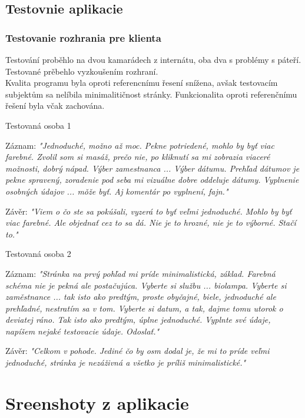 \newpage

\subsection{Testovnie aplikacie} \label{client_testing}

\subsubsection{Testovanie rozhrania pre klienta}
Testování proběhlo na dvou kamarádech z internátu, oba dva s problémy s páteří. \\
Testované prěbehlo vyzkoušením rozhraní.\\
Kvalita programu byla oproti referencnímu řesení snížena, avšak testovacím subjektům sa nelíbila minimalitičnost stránky.
Funkcionalita oproti referenčnímu řešení byla včak zachována.


Testovaná osoba 1

Záznam:
\textit{"Jednoduché, možno až moc. Pekne potriedené, mohlo by byť viac farebné. Zvolil som si masáž, prečo nie, po kliknutí sa
mi zobrazia viaceré možnosti,
dobrý nápad. Výber zamestnanca ... Výber dátumu. Prehľad dátumov je pekne spravený, zoradenie pod seba mi vizuálne
dobre oddeluje dátumy. Vyplnenie
osobných údajov ... mǒže byť. Aj komentár po vyplnení, fajn."}

Závěr:
\textit{"Viem o čo ste sa pokúšali, vyzerá to byť veľmi jednoduché. Mohlo by byť viac farebné. Ale objednať cez to sa dá.
Nie je to hrozné, nie je to výborné. Stačí to."}


Testovaná osoba 2

Záznam:
\textit{"Stránka na prvý pohľad mi príde minimalistická, základ. Farebná schéma nie je pekná ale postačujúca. Vyberte si službu
... biolampa. Vyberte si zaměstnance ...
tak isto ako predtým, proste obyčajné, biele, jednoduché ale prehľadné, nestratím sa v tom. Vyberte si datum, a tak,
dajme tomu utorok o deviatej ráno.
Tak isto ako predtým, úplne jednoduché.
Vyplnte své údaje, napíšem nejaké testovacie údaje. Odoslať."}

Závěr:
\textit{"Celkom v pohode. Jediné čo by osm dodal je, že mi to príde veľmi jednoduché, stránka je nezáživná a všetko je príliš
minimalistické."}

\newpage

\section{Sreenshoty z aplikacie}

